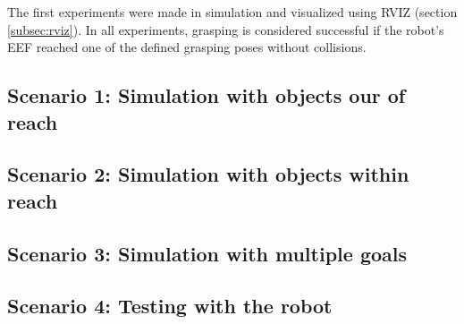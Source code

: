 The first experiments were made in simulation and visualized using RVIZ (section \ref{subsec:rviz}). In all experiments, grasping is considered successful if the robot's EEF reached one of the defined grasping poses without collisions. 

\subsection{Scenario 1: Simulation with objects our of reach}





\subsection{Scenario 2: Simulation with objects within reach}


\subsection{Scenario 3: Simulation with multiple goals}


\subsection{Scenario 4: Testing with the robot}

